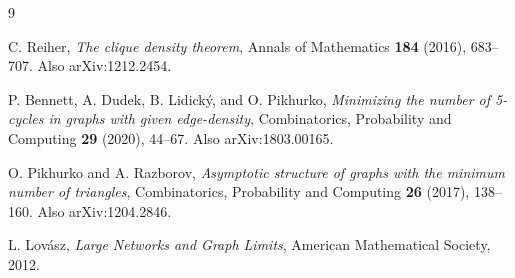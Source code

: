 \documentclass[11pt]{amsart}
\theoremstyle{definition}
\newcommand{\1}{\mathbf 1}
\begin{document}
\begin{thebibliography}{9}

C. Reiher,
\emph{The clique density theorem},
Annals of Mathematics \textbf{184} (2016), 683--707.
Also arXiv:1212.2454.

P. Bennett, A. Dudek, B. Lidick\'y, and O. Pikhurko,
\emph{Minimizing the number of 5-cycles in graphs with given edge-density},
Combinatorics, Probability and Computing \textbf{29} (2020), 44--67.
Also arXiv:1803.00165.

O. Pikhurko and A. Razborov,
\emph{Asymptotic structure of graphs with the minimum number of triangles},
Combinatorics, Probability and Computing \textbf{26} (2017), 138--160.
Also arXiv:1204.2846.

L. Lov\'asz,
\emph{Large Networks and Graph Limits},
American Mathematical Society, 2012.

\end{thebibliography}
\end{document}
